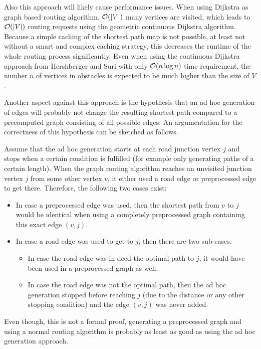 		Also this approach will likely cause performance issues.
		When using Dijkstra as graph based routing algorithm, $\mathcal{O}(|V|)$ many vertices are visited, which leads to $\mathcal{O}(|V|)$ routing requests using the geometric continuous Dijkstra algorithm.
		Because a simple caching of the shortest path map is not possible, at least not without a smart and complex caching strategy, this decreases the runtime of the whole routing process significantly.
		Even when using the continuous Dijkstra approach from Hershberger and Suri \cite{hershberger-suri} with only $\mathcal{O}(n \log n)$ time requirement, the number $n$ of vertices in obstacles is expected to be much higher than the size of $V$.
		
		Another aspect against this approach is the hypothesis that an ad hoc generation of edges will probably not change the resulting shortest path compared to a precomputed graph consisting of all possible edges.
		An argumentation for the correctness of this hypothesis can be sketched as follows.
		
		Assume that the ad hoc generation starts at each road junction vertex $j$ and stops when a certain condition is fulfilled (for example only generating paths of a certain length).
		When the graph routing algorithm reaches an unvisited junction vertex $j$ from some other vertex $v$, it either used a road edge or preprocessed edge to get there. Therefore, the following two cases exist:
		
		\begin{itemize}
			\item In case a preprocessed edge was used, then the shortest path from $v$ to $j$ would be identical when using a completely preprocessed graph containing this exact edge $(v, j)$.
			\item In case a road edge was used to get to $j$, then there are two sub-cases.
			\begin{itemize}
				\item In case the road edge was in deed the optimal path to $j$, it would have been used in a preprocessed graph as well.
				\item In case the road edge was not the optimal path, then the ad hoc generation stopped before reaching $j$ (due to the distance or any other stopping condition) and the edge $(v, j)$ was never added.
			\end{itemize}
		\end{itemize}
		
		Even though, this is not a formal proof, generating a preprocessed graph and using a normal routing algorithm is probably as least as good as using the ad hoc generation approach.
	
